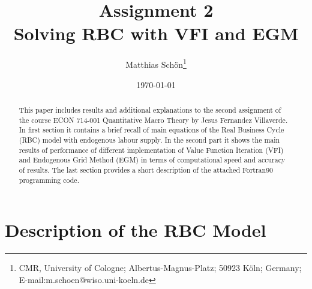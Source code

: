 \documentclass[a4paper,12pt]{article}
\begin{document}
\title{Assignment 2 \\ Solving RBC with VFI and EGM}
\author{Matthias Sch\"{o}n\thanks{CMR, University of Cologne; Albertus-Magnus-Platz; 50923 K\"{o}ln; Germany; E-mail:m.schoen@wiso.uni-koeln.de}}
\date{\today }
\maketitle

\begin{abstract}
This paper includes results and additional explanations to the second assignment of the course ECON 714-001 Quantitative Macro Theory by Jesus Fernandez Villaverde. In first section it contains a brief recall of main equations of the Real Business Cycle (RBC) model with endogenous labour supply. In the second part it shows the main results of performance of different implementation of Value Function Iteration (VFI) and Endogenous Grid Method (EGM) in terms of computational speed and accuracy of results. The last section provides a short description of the attached Fortran90 programming code.
\end{abstract}

\newpage {} \renewcommand{\thefootnote}{
\arabic{footnote}} \setcounter{footnote}{0}

\section*{Description of the RBC Model}
\end{document}
